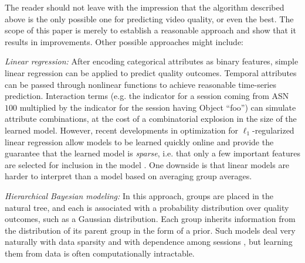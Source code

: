 The reader should not leave with the impression that the algorithm described above is the only possible one for predicting video quality, or even the best.  The scope of this paper is merely to establish a reasonable approach and show that it results in improvements.  Other possible approaches might include:
\begin{packedenumerate}
  \item \emph{Linear regression:} After encoding categorical attributes as binary features, simple linear regression can be applied to predict quality outcomes.  Temporal attributes can be passed through nonlinear functions to achieve reasonable time-series prediction.  Interaction terms (e.g. the indicator for a session coming from ASN $100$ multiplied by the indicator for the session having Object ``foo'') can simulate attribute combinations, at the cost of a combinatorial explosion in the size of the learned model.  However, recent developments in optimization for $\ell_1$-regularized linear regression allow models to be learned quickly online and provide the guarantee that the learned model is \emph{sparse}, i.e. that only a few important features are selected for inclusion in the model \cite{duchi2010composite}.  One downside is that linear models are harder to interpret than a model based on averaging group averages.
  \item \emph{Hierarchical Bayesian modeling:} In this approach, groups are placed in the natural tree, and each is associated with a probability distribution over quality outcomes, such as a Gaussian distribution.  Each group inherits information from the distribution of its parent group in the form of a prior.  Such models deal very naturally with data sparsity and with dependence among sessions \cite{gelman2003bayesian}, but learning them from data is often computationally intractable.
\end{packedenumerate}